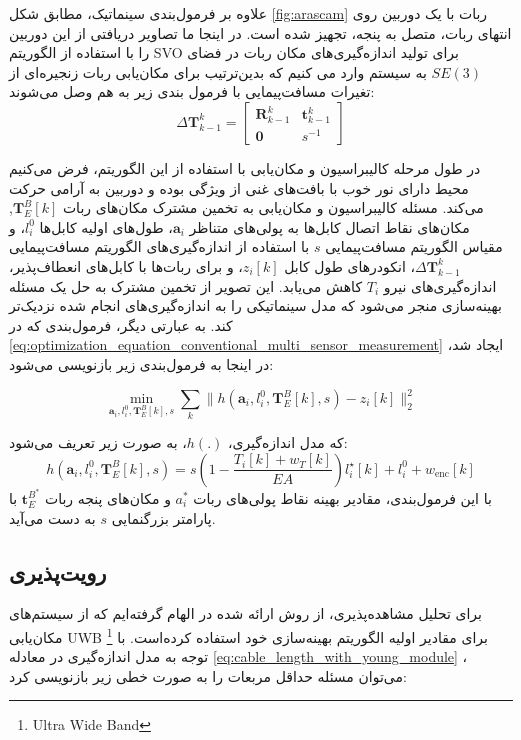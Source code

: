 علاوه بر فرمول‌بندی سینماتیک، مطابق شکل
\ref{fig:arascam}
 ربات با یک دوربین روی انتهای ربات، متصل به پنجه، تجهیز شده است. در اینجا ما تصاویر دریافتی از این دوربین را با استفاده از الگوریتم SVO
\cite{Forster2014ICRA}
  برای تولید اندازه‌گیری‌های مکان ربات در فضای
$SE(3)$
به سیستم وارد می کنیم که بدین‌ترتیب برای مکان‌یابی ربات زنجیره‌ای از تغیرات مسافت‌پیمایی با فرمول بندی زیر به هم وصل می‌شوند:
\begin{equation}
	\Delta \boldsymbol{T}^k_{k-1} = \begin{bmatrix} \boldsymbol{R}^k_{k-1} & \boldsymbol{t}^k_{k-1} \\ \boldsymbol{0} & s^{-1} \end{bmatrix}
\end{equation}

در طول مرحله کالیبراسیون و مکان‌یابی با استفاده از این الگوریتم، فرض می‌کنیم محیط‌ دارای نور خوب با بافت‌های غنی از ویژگی بوده و دوربین به آرامی حرکت می‌کند.  مسئله کالیبراسیون و مکان‌یابی به تخمین مشترک مکان‌های ربات
$\boldsymbol{T}^B_E [k]$,
مکان‌های نقاط اتصال کابل‌ها به پولی‌های متناظر
$\boldsymbol{a}_i$،
 طول‌های اولیه کابل‌ها
$l_{i}^0$،
و مقیاس الگوریتم مسافت‌پیمایی
$s$
با استفاده از اندازه‌گیری‌های الگوریتم مسافت‌پیمایی
 \( \Delta \boldsymbol{T}^k_{k-1} \)،
انکودرهای طول کابل
$z_i [k]$،
و برای ربات‌ها با کابل‌های انعطاف‌پذیر، اندازه‌گیری‌های نیرو 
$T_i$ 
کاهش می‌یابد. این تصویر از تخمین مشترک به حل یک مسئله بهینه‌سازی منجر می‌شود که مدل سینماتیکی را به اندازه‌گیری‌های انجام شده نزدیک‌تر کند. به عبارتی دیگر، فرمول‌بندی که در
 \ref{eq:optimization_equation_conventional_multi_sensor_measurement} 
 ایجاد شد، در اینجا به فرمول‌بندی زیر بازنویسی می‌شود:

\begin{equation}
	\min_{\boldsymbol{a}_i, l_{i}^0, \boldsymbol{T}^B_E [k], s} \sum_k \| h(\boldsymbol{a}_i, l_{i}^0, \boldsymbol{T}^B_E [k], s) - z_i [k] \|^2_2
\end{equation}

که مدل اندازه‌گیری، \( h(.) \)، به صورت زیر تعریف می‌شود:
\begin{equation} \label{eq:mathmatic_model_rigid_cable}
	h(\boldsymbol{a}_i, l_{i}^0, \boldsymbol{T}^B_E [k], s) = s \left( 1 - \frac{T_i [k] + w_T [k]}{EA} \right) l^\star_i [k] + l_{i}^0 + w_{\text{enc}} [k] 
\end{equation}
با این فرمول‌بندی، مقادیر بهینه نقاط پولی‌های ربات
$a_i^*$
و مکان‌های پنجه ربات
$\boldsymbol{t}^{B^{*}}_{E}$
با پارامتر بزرگنمایی
$s$
به دست می‌آید.


\subsection{رویت‌پذیری}
برای تحلیل مشاهده‌پذیری، از روش ارائه شده در
\cite{blueml2021bias}
الهام گرفته‌ایم که از سیستم‌های مکان‌یابی  UWB 
\footnote{Ultra Wide Band}
برای مقادیر اولیه الگوریتم بهینه‌سازی خود استفاده کرده‌است. با توجه به مدل اندازه‌گیری در معادله
\ref{eq:cable_length_with_young_module}
، می‌توان مسئله حداقل مربعات را به صورت خطی زیر بازنویسی کرد:

